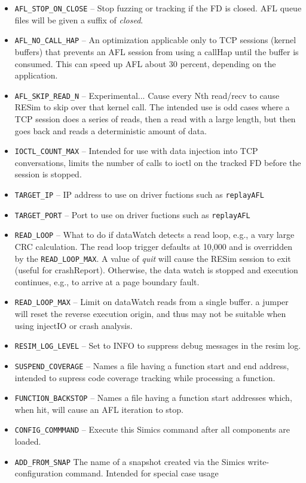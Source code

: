 \documentclass[titlepage]{article}
\begin{document}
\begin{itemize}
\item {\tt AFL\_STOP\_ON\_CLOSE} -- Stop fuzzing or tracking if the FD is closed.  AFL queue files will be given a suffix of \textit{closed}.
\item {\tt AFL\_NO\_CALL\_HAP} -- An optimization applicable only to TCP sessions (kernel buffers) that prevents an AFL session 
from using a callHap until the buffer is consumed.  This can speed up AFL about 30 percent, depending on the application.
\item {\tt AFL\_SKIP\_READ\_N} -- Experimental... Cause every Nth read/recv to cause RESim to skip over that kernel call.  The intended use is odd
cases where a TCP session does a series of reads, then a read with a large length, but then goes back and reads a deterministic amount of data.
\item {\tt IOCTL\_COUNT\_MAX} -- Intended for use with data injection into TCP conversations, limits the number of calls to ioctl on the tracked FD before the
session is stopped.
\item {\tt TARGET\_IP} -- IP address to use on driver fuctions such as {\tt replayAFL}
\item {\tt TARGET\_PORT} -- Port to use on driver fuctions such as {\tt replayAFL}
\item {\tt READ\_LOOP} -- What to do if dataWatch detects a read loop, e.g., a vary large CRC calculation.  The read loop trigger defaults at 10,000
and is overridden by the {\tt READ\_LOOP\_MAX}.  A value of \textit{quit} will cause
the RESim session to exit (useful for crashReport).  Otherwise, the data watch is stopped and execution continues, e.g., to arrive at a page boundary fault.
\item {\tt READ\_LOOP\_MAX} -- Limit on dataWatch reads from a single buffer.
a jumper will reset the reverse execution origin, and thus may not be suitable when using injectIO or crash analysis.
\item {\tt RESIM\_LOG\_LEVEL} -- Set to INFO to suppress debug messages in the resim log.
\item {\tt SUSPEND\_COVERAGE} -- Names a file having a function start and end address, intended to supress code coverage tracking while processing a function.
\item {\tt FUNCTION\_BACKSTOP} -- Names a file having a function start addresses which, when hit, will cause an AFL iteration to stop.
\item {\tt CONFIG\_COMMMAND} -- Execute this Simics command after all components are loaded.
\item {\tt ADD\_FROM\_SNAP} The name of a snapshot created via the Simics write-configuration command.  Intended for special case usage

\end{itemize}
\end{document}
